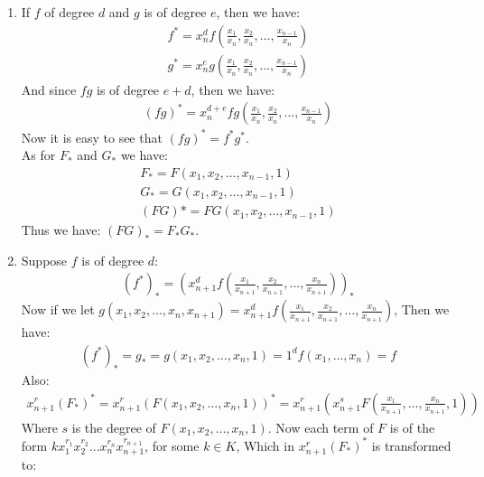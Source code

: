 \begin{enumerate}[label=\ilabel]
    \item 
        If $f$ of degree $d$ and $g$ is of degree $e$, then we have:
        \begin{gather*}
            f^* = x_n^d f(\frac{x_1}{x_n}, \frac{x_2}{x_n}, \dots, \frac{x_{n - 1}}{x_n}) \\
            g^* = x_n^e g(\frac{x_1}{x_n}, \frac{x_2}{x_n}, \dots, \frac{x_{n - 1}}{x_n})
        \end{gather*}
        And since $fg$ is of degree $e + d$, then we have:
        \begin{gather*}
            (fg)^* = x_n^{d + e} fg(\frac{x_1}{x_n}, \frac{x_2}{x_n}, \dots, \frac{x_{n - 1}}{x_n})
        \end{gather*}
        Now it is easy to see that $(fg)^* = f^* g^*$. \\
        As for $F_*$ and $G_*$ we have:
        \begin{gather*}
            F_* = F(x_1, x_2, \dots, x_{n - 1}, 1) \\
            G_* = G(x_1, x_2, \dots, x_{n - 1}, 1) \\
            (FG)* = FG(x_1, x_2, \dots, x_{n - 1}, 1)
        \end{gather*}
        Thus we have: $(FG)_* = F_* G_*$. 
    \item 
        Suppose $f$ is of degree $d$:
        \begin{gather*}
            (f^*)_* = (x_{n + 1}^d f(\frac{x_1}{x_{n + 1}}, \frac{x_2}{x_{n+ 1}}, \dots, \frac{x_{n}}{x_{n + 1}}))_*
        \end{gather*}
        Now if we let $g(x_1, x_2, \dots, x_n, x_{n + 1}) = x_{n + 1}^d f(\frac{x_1}{x_{n + 1}}, \frac{x_2}{x_{n+ 1}}, \dots, \frac{x_{n}}{x_{n + 1}})$, Then we have:
        \begin{gather*}
            (f^*)_* = g_* = g(x_1, x_2, \dots, x_n, 1) = 1^d f(x_1, \dots, x_n) = f
        \end{gather*}
        Also:
        \begin{gather*}
            x_{n + 1}^r (F_*)^* = x_{n + 1}^r (F(x_1, x_2, \dots, x_n, 1))^* = x_{n + 1}^r (x_{n + 1}^s F(\frac{x_1}{x_{n + 1}}, \dots, \frac{x_n}{x_{n + 1}}, 1))
        \end{gather*}
        Where $s$ is the degree of $F(x_1, x_2, \dots, x_n, 1)$. Now each term of $F$ is of the form $k x_1^{r_1} x_2^{r_2} \dots x_n^{r_n} x_{n + 1}^{r_{n + 1}}$, for some $k \in K$, Which in $x_{n + 1}^r(F_*)^*$ is transformed to:

\end{enumerate}
